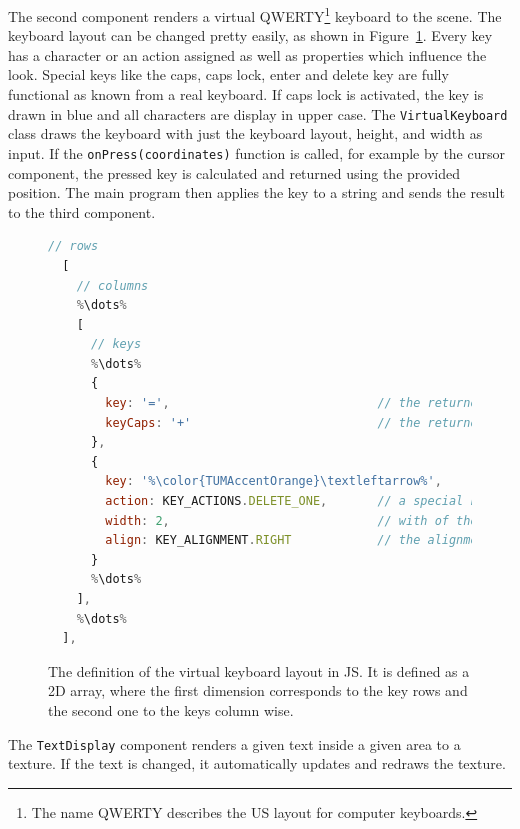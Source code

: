 The second component renders a virtual QWERTY\footnote{The name QWERTY describes the US layout for computer keyboards.} keyboard to the scene. The keyboard layout can be changed pretty easily, as shown in Figure~\ref{fig:virtual-keyboard-layout}. Every key has a character or an action assigned as well as properties which influence the look. Special keys like the caps, caps lock, enter and delete key are fully functional as known from a real keyboard. If caps lock is activated, the key is drawn in blue and all characters are display in upper case. The \lstinline{VirtualKeyboard} class draws the keyboard with just the keyboard layout, height, and width as input. If the \lstinline{onPress(coordinates)} function is called, for example by the cursor component, the pressed key is calculated and returned using the provided position. The main program then applies the key to a string and sends the result to the third component. %

\begin{figure}[H]
  \begin{lstlisting}[language=JavaScript]
  // rows
  [
    // columns
    %\dots%
    [ 
      // keys
      %\dots%
      {
        key: '=',                             // the returned character if no action is present otherwise just a label
        keyCaps: '+'                          // the returned character if in caps mode 
      },
      {
        key: '%\color{TUMAccentOrange}\textleftarrow%',
        action: KEY_ACTIONS.DELETE_ONE,       // a special key action; in this case, it deletes the last character
        width: 2,                             // with of the key
        align: KEY_ALIGNMENT.RIGHT            // the alignment of the label on the key
      }
      %\dots%
    ],
    %\dots%
  ],
  \end{lstlisting}
  \caption[Virtual keyboard layout definition]{The definition of the virtual keyboard layout in \ac{JS}. It is defined as a \ac{2D} array, where the first dimension corresponds to the key rows and the second one to the keys column wise.}\label{fig:virtual-keyboard-layout}
\end{figure}

The \lstinline{TextDisplay} component renders a given text inside a given area to a texture. If the text is changed, it automatically updates and redraws the texture.